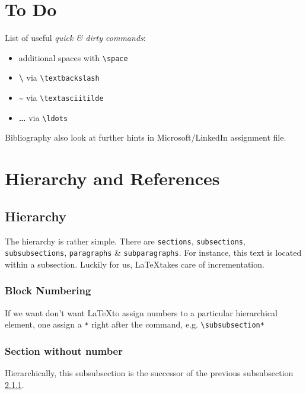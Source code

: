 \documentclass[a4paper]{scrartcl}
\begin{document}
	\section{To Do}
	List of useful \emph{quick \& dirty commands}:
	
	\begin{itemize}
		\item additional \space \space spaces \space \space \space with \texttt{\textbackslash space}
		\item \textbf{\textbackslash} \space via \texttt{\textbackslash textbackslash}
		\item \textbf{\textasciitilde} \space via \texttt{\textbackslash textasciitilde}
		\item \textbf{\ldots} \space via \texttt{\textbackslash ldots}
		
	\end{itemize}
	{\Huge Bibliography}
	also look at further hints in Microsoft/LinkedIn assignment file.
	
	\section{Hierarchy and References}\label{HaR}
	
	\subsection{Hierarchy}\label{Hie}
	
	The hierarchy is rather simple. There are \texttt{sections}, \texttt{subsections}, \texttt{subsubsections}, \texttt{paragraphs} \& \texttt{subparagraphs}. For instance, this text is located within a subsection. Luckily for us, \LaTeX \space takes care of incrementation.
	
	\subsubsection{Block Numbering}\label{sssbn}
	If we want don't want \LaTeX to assign numbers to a particular hierarchical element, one assign a \texttt{*} right after the command, e.g. \texttt{\textbackslash subsubsection*}
	
	\subsubsection*{Section without number}
	Hierarchically, this subsubsection is the successor of the previous subsubsection \ref{sssbn}.
	
\end{document}
